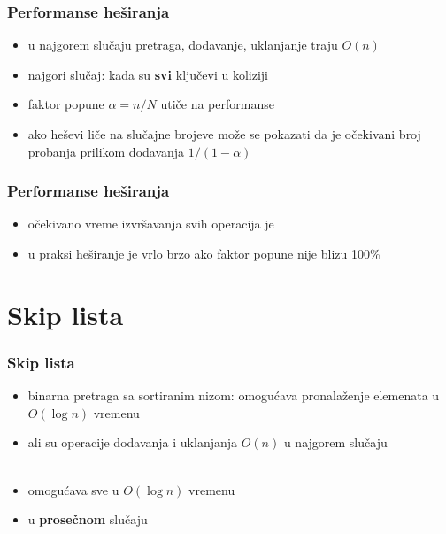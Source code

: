 \documentclass[compress,aspectratio=169]{beamer}
\begin{document}
\begin{frame}[fragile]
  \frametitle{Performanse heširanja}
  \begin{itemize}
    \item u najgorem slučaju pretraga, dodavanje, uklanjanje traju $O(n)$
    \item najgori slučaj: kada su \textbf{svi} ključevi u koliziji
    \item faktor popune $\alpha = n/N$ utiče na performanse
    \item ako heševi liče na slučajne brojeve može se pokazati da je očekivani broj probanja prilikom dodavanja $1/(1-\alpha)$
  \end{itemize}
\end{frame}

\begin{frame}[fragile]
  \frametitle{Performanse heširanja}
  \begin{itemize}
    \item očekivano vreme izvršavanja svih operacija je 
    \item u praksi heširanje je vrlo brzo ako faktor popune nije blizu 100\%
  \end{itemize}
\end{frame}

\section[Skip lista]{Skip lista}
\begin{frame}[fragile]
  \frametitle{Skip lista}
  \begin{itemize}
    \item binarna pretraga sa sortiranim nizom: omogućava pronalaženje elemenata u $O(\log n)$ vremenu
    \item ali su operacije dodavanja i uklanjanja $O(n)$ u najgorem slučaju \\ \ \\
    \item {} omogućava sve u $O(\log n)$ vremenu
    \item u \textbf{prosečnom} slučaju
  \end{itemize}
\end{frame}
\end{document}
